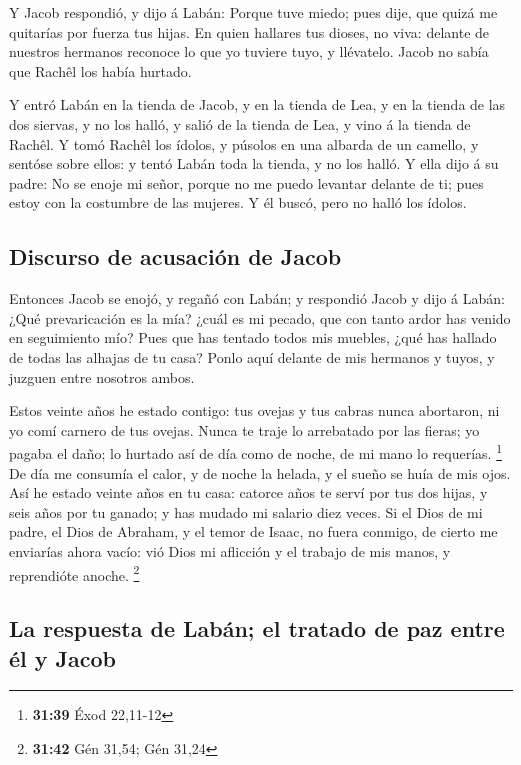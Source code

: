  Y Jacob respondió, y dijo á Labán: Porque tuve miedo; pues
dije, que quizá me quitarías por fuerza tus hijas.  En
quien hallares tus dioses, no viva: delante de nuestros hermanos
reconoce lo que yo tuviere tuyo, y llévatelo. Jacob no sabía que Rachêl
los había hurtado.

 Y entró Labán en la tienda de Jacob, y en la tienda de
Lea, y en la tienda de las dos siervas, y no los halló, y salió de la
tienda de Lea, y vino á la tienda de Rachêl.  Y tomó Rachêl
los ídolos, y púsolos en una albarda de un camello, y sentóse sobre
ellos: y tentó Labán toda la tienda, y no los halló.  Y
ella dijo á su padre: No se enoje mi señor, porque no me puedo levantar
delante de ti; pues estoy con la costumbre de las mujeres. Y él buscó,
pero no halló los ídolos.

\hypertarget{discurso-de-acusaciuxf3n-de-jacob}{%
\subsection{Discurso de acusación de
Jacob}\label{discurso-de-acusaciuxf3n-de-jacob}}

 Entonces Jacob se enojó, y regañó con Labán; y respondió
Jacob y dijo á Labán: ¿Qué prevaricación es la mía? ¿cuál es mi pecado,
que con tanto ardor has venido en seguimiento mío?  Pues
que has tentado todos mis muebles, ¿qué has hallado de todas las alhajas
de tu casa? Ponlo aquí delante de mis hermanos y tuyos, y juzguen entre
nosotros ambos.

 Estos veinte años he estado contigo: tus ovejas y tus
cabras nunca abortaron, ni yo comí carnero de tus ovejas. 
Nunca te traje lo arrebatado por las fieras; yo pagaba el daño; lo
hurtado así de día como de noche, de mi mano lo requerías. \footnote{\textbf{31:39}
  Éxod 22,11-12}  De día me consumía el calor, y de noche
la helada, y el sueño se huía de mis ojos.  Así he estado
veinte años en tu casa: catorce años te serví por tus dos hijas, y seis
años por tu ganado; y has mudado mi salario diez veces.  Si
el Dios de mi padre, el Dios de Abraham, y el temor de Isaac, no fuera
conmigo, de cierto me enviarías ahora vacío: vió Dios mi aflicción y el
trabajo de mis manos, y reprendióte anoche. \footnote{\textbf{31:42} Gén
  31,54; Gén 31,24}

\hypertarget{la-respuesta-de-labuxe1n-el-tratado-de-paz-entre-uxe9l-y-jacob}{%
\subsection{La respuesta de Labán; el tratado de paz entre él y
Jacob}\label{la-respuesta-de-labuxe1n-el-tratado-de-paz-entre-uxe9l-y-jacob}}

